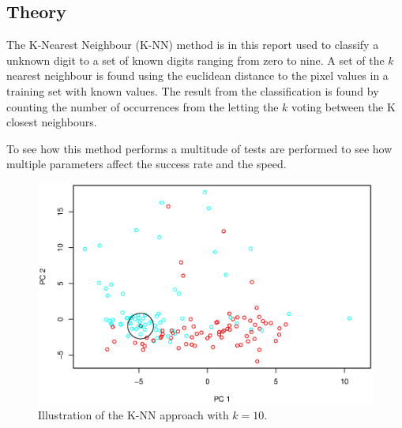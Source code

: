 \subsection{Theory}
The K-Nearest Neighbour (K-NN) method is in this report used to classify a unknown digit to a set of known digits ranging from zero to nine.
A set of the $k$ nearest neighbour is found using the euclidean distance to the pixel values in a training set with known values.
The result from the classification is found by counting the number of occurrences from the 
letting the $k$ voting between the K closest neighbours.

To see how this method performs a multitude of tests are performed to see how multiple parameters affect the success rate and the speed.


\begin{figure}[H]
\centering
\includegraphics[width = 0.8 \textwidth]{graphics/knn_vis}
\caption{Illustration of the K-NN approach with $k = 10$.}
\label{fig:knn_illustration}
\end{figure}
